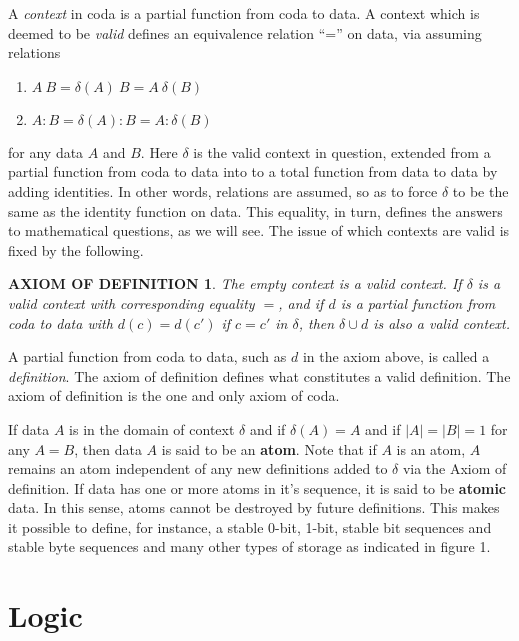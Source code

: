 \documentclass[11pt]{article}
\begin{document}
A {\it context} in coda is a partial function from coda to data.  A context which is deemed to be {\it valid} defines an equivalence relation ``='' on data, via assuming relations 
\begin{enumerate}
\item[] $A\ B = \delta(A)\ B = A\ \delta(B)$
\item[] $A:B = \delta(A):B = A:\delta(B)$
\end{enumerate}
for any data $A$ and $B$.  Here $\delta$ is the valid context in question, extended from a partial function from coda to data into to a total function from data to data by adding identities.  In other words, relations are assumed, so as to force $\delta$ to be the same as the identity function on data.  This equality, in turn, defines the answers to mathematical questions, as we will see.  The issue of which contexts are valid is fixed by the following.

\newtheorem{axiom}{Axiom}
\newtheorem{theorem}{Theorem}

\newtheorem*{remark}{AXIOM OF DEFINITION} 

\begin{remark}  The empty context is a valid context.  If $\delta$ is a valid context with corresponding equality $=$, and if $d$ is a partial function from coda to data with $d(c)=d(c')$ if $c=c'$ in $\delta$, then $\delta\cup d$ is also a valid context.  
\end{remark}

A partial function from coda to data, such as $d$ in the axiom above, is called a {\it definition}.  The axiom of definition 
defines what constitutes a valid definition.   The axiom of definition is the one and only axiom of coda. 

If data $A$ is in the domain of context $\delta$ and if $\delta(A)=A$ and if $|A|=|B|=1$ for any $A=B$, then data $A$ is 
said to be an {\bf atom}.  Note that if $A$ is an atom, $A$ remains an atom independent of any new definitions added to $\delta$ via the Axiom of definition.  If data has one or more atoms in it's sequence, it is said to be {\bf atomic} data.  In this sense, atoms cannot be destroyed by future definitions.  This makes it possible to define, for instance, a stable 0-bit, 1-bit, stable bit sequences and stable byte sequences and many other types of storage as indicated in figure 1. 

\section{Logic}
\end{document}
